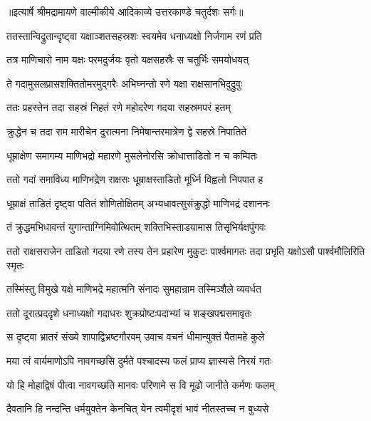 {॥इत्यार्षे श्रीमद्रामायणे वाल्मीकीये आदिकाव्ये उत्तरकाण्डे चतुर्दशः सर्गः॥}


\twolineshloka
{ततस्तान्विद्रुतान्दृष्ट्वा यक्षाञ्शतसहस्रशः}
{स्वयमेव धनाध्यक्षो निर्जगाम रणं प्रति} %

\twolineshloka
{तत्र माणिचारो नाम यक्षः परमदुर्जयः}
{वृतो यक्षसहस्रैः स चतुर्भिः समयोधयत्} %

\twolineshloka
{ते गदामुसलप्रासशक्तितोमरमुद्गरैः}
{अभिघ्नन्तो रणे यक्षा राक्षसानभिदुद्रुवुः} %

\twolineshloka
{ततः प्रहस्तेन तदा सहस्रं निहतं रणे}
{महोदरेण गदया सहस्रमपरं हतम्} %

\twolineshloka
{क्रुद्धेन च तदा राम मारीचेन दुरात्मना}
{निमेषान्तरमात्रेण द्वे सहस्रे निपातिते} %

\twolineshloka
{धूम्राक्षेण समागम्य माणिभद्रो महारणे}
{मुसलेनोरसि क्रोधात्ताडितो न च कम्पितः} %

\twolineshloka
{ततो गदां समाविध्य माणिभद्रेण राक्षसः}
{धूम्राक्षस्ताडितो मूर्ध्नि विह्वलो निपपात ह} %

\twolineshloka
{धूम्राक्षं ताडितं दृष्ट्वा पतितं शोणितोक्षितम्}
{अभ्यधावत्सुसंक्रुद्धो माणिभद्रं दशाननः} %

\twolineshloka
{तं क्रुद्धमभिधावन्तं युगान्ताग्निमिवोत्थितम्}
{शक्तिभिस्ताडयामास तिसृभिर्यक्षपुंगवः} %

\threelineshloka
{ततो राक्षसराजेन ताडितो गदया रणे}
{तस्य तेन प्रहारेण मुकुटः पार्श्वमागतः}
{तदा प्रभृति यक्षोऽसौ पार्श्वमौलिरिति स्मृतः} %

\twolineshloka
{तस्मिंस्तु विमुखे यक्षे माणिभद्रे महात्मनि}
{संनादः सुमहान्राम तस्मिञ्शैले व्यवर्धत} %

\twolineshloka
{ततो दूरात्प्रददृशे धनाध्यक्षो गदाधरः}
{शुक्रप्रोष्टःपदाभ्यां च शङ्खपद्मसमावृतः} %

\twolineshloka
{स दृष्ट्वा भ्रातरं संख्ये शापाद्विभ्रष्टगौरवम्}
{उवाच वचनं धीमान्युक्तं पैतामहे कुले} %

\twolineshloka
{मया त्वं वार्यमाणोऽपि नावगच्छसि दुर्मते}
{पश्चादस्य फलं प्राप्य ज्ञास्यसे निरयं गतः} %

\twolineshloka
{यो हि मोहाद्विषं पीत्वा नावगच्छति मानवः}
{परिणामे स वि मूढो जानीते कर्मणः फलम्} %

\twolineshloka
{दैवतानि हि नन्दन्ति धर्मयुक्तेन केनचित्}
{येन त्वमीदृशं भावं नीतस्तच्च न बुध्यसे} %

